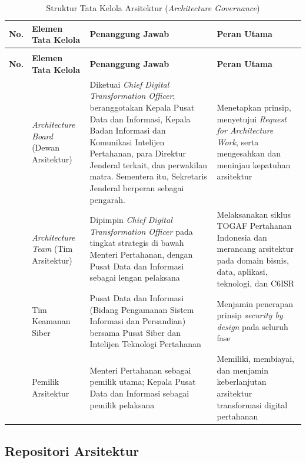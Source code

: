 {\small
\begin{longtable}{@{}>{\raggedright\arraybackslash}p{}>{\raggedright\arraybackslash}p{}>{\raggedright\arraybackslash}p{}>{\raggedright\arraybackslash}p{}@{}}
\caption{Struktur Tata Kelola Arsitektur (\textit{Architecture Governance})}
\label{tab:d4-3}\\
\toprule
\textbf{No.} & \textbf{Elemen Tata Kelola} & \textbf{Penanggung Jawab} & \textbf{Peran Utama}\\
\midrule
\endfirsthead
\multicolumn{4}{@{}l}{\small\itshape \tablename\ \thetable{} (lanjutan)}\\
\toprule
\textbf{No.} & \textbf{Elemen Tata Kelola} & \textbf{Penanggung Jawab} & \textbf{Peran Utama}\\
\midrule
\endhead
\bottomrule
\endlastfoot
1 & \textit{Architecture Board} (Dewan Arsitektur) & Diketuai \textit{Chief Digital Transformation Officer}; beranggotakan Kepala Pusat Data dan Informasi, Kepala Badan Informasi dan Komunikasi Intelijen Pertahanan, para Direktur Jenderal terkait, dan perwakilan matra. Sementera itu, Sekretaris Jenderal berperan sebagai pengarah. & Menetapkan prinsip, menyetujui \textit{Request for Architecture Work}, serta mengesahkan dan meninjau kepatuhan arsitektur\\
2 & \textit{Architecture Team} (Tim Arsitektur) & Dipimpin \textit{Chief Digital Transformation Officer} pada tingkat strategis di bawah Menteri Pertahanan, dengan Pusat Data dan Informasi sebagai lengan pelaksana & Melaksanakan siklus TOGAF Pertahanan Indonesia dan merancang arsitektur pada domain bisnis, data, aplikasi, teknologi, dan C6ISR\\
3 & Tim Keamanan Siber & Pusat Data dan Informasi (Bidang Pengamanan Sistem Informasi dan Persandian) bersama Pusat Siber dan Intelijen Teknologi Pertahanan & Menjamin penerapan prinsip \textit{security by design} pada seluruh fase\\
4 & Pemilik Arsitektur & Menteri Pertahanan sebagai pemilik utama; Kepala Pusat Data dan Informasi sebagai pemilik pelaksana & Memiliki, membiayai, dan menjamin keberlanjutan arsitektur transformasi digital pertahanan\\
\end{longtable}
}

\subsection{Repositori Arsitektur}


